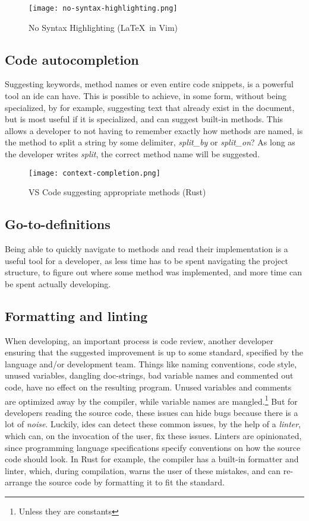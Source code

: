 \begin{figure}
  \centering
  \texttt{[image: no-syntax-highlighting.png]}
  \caption{No Syntax Highlighting (\LaTeX\ in Vim)}
  \label{pic:noStx}
\end{figure}

\subsection{Code autocompletion}

Suggesting keywords, method names or even entire code snippets, is a powerful
tool an \gls*{ide} can have. This is possible to achieve, in some form, without
being specialized, by for example, suggesting text that already exist in the
document, but is most useful if it is specialized, and can suggest built-in
methods. This allows a developer to not having to remember exactly how methods
are named, is the method to split a string by some delimiter, \textit{split\_by}
or \textit{split\_on}? As long as the developer writes \textit{split}, the
correct method name will be suggested.

\begin{figure}
  \centering
  \texttt{[image: context-completion.png]}
  \caption{VS Code suggesting appropriate methods (Rust)}
  \label{pic:completion}
\end{figure}

\subsection{Go-to-definitions}

Being able to quickly navigate to methods and read their implementation is a
useful tool for a developer, as less time has to be spent navigating the project
structure, to figure out where some method was implemented, and more time can be
spent actually developing.

\subsection{Formatting and linting}

When developing, an important process is code review, another developer ensuring
that the suggested improvement is up to some standard, specified by the
language and/or development team. Things like naming conventions, code style,
unused variables, dangling doc-strings, bad variable names and commented out
code, have no effect on the resulting program. Unused variables and comments
are optimized away by the compiler, while variable names are mangled.\footnote{Unless they are constants}
But for developers reading the source code, these issues can hide bugs because
there is a lot of \textit{noise}. Luckily, \gls*{ide}s can detect these common
issues, by the help of a \textit{linter}, which can, on the invocation of the
user, fix these issues. Linters are opinionated, since programming language
specifications specify conventions on how the source code should look. In Rust
for example, the compiler has a built-in formatter and linter, which, during
compilation, warns the user of these mistakes, and can re-arrange the source
code by formatting it to fit the standard.

